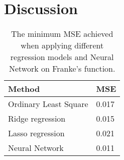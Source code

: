 \section{Discussion}
\label{sec:discussion}

\begin{table}[htbp]
	\renewcommand{\arraystretch}{1.2}
	\centering
	\caption{The minimum MSE achieved when applying different regression models and Neural Network on Franke's function.}
	\begin{tabular}{l l}
		\toprule
		Method & MSE \\
		\midrule
		Ordinary Least Square & 0.017 \\
		Ridge regression & 0.015\\
		Lasso regression & 0.021\\
		Neural Network & 0.011\\
		\bottomrule
	\end{tabular}
	\label{tab:mse}
\end{table}